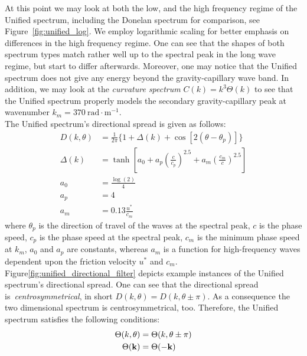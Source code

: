 At this point we may look at both the low, and the high frequency regime of the 
Unified spectrum, including the Donelan spectrum for comparison, see 
Figure~\ref{fig:unified_log}. We employ logarithmic scaling for better
emphasis on differences in the high frequency regime. One can see that the shapes
of both spectrum types match rather well up to the spectral peak in the long wave regime,
but start to differ afterwards. Moreover, one may notice that the Unified spectrum
does not give any energy beyond the gravity-capillary wave band. In addition, we may
look at the \emph{curvature spectrum} $C(k) = k^3\Theta(k)$ to see that the Unified 
spectrum properly models the secondary gravity-capillary peak at wavenumber 
$k_m = 370~\text{rad}\cdot\text{m}^{-1}$.\\

The Unified spectrum's directional spread is given as follows:
%
\begin{subequations}
\begin{align}
D(k, \theta) &= \frac{1}{2\pi}\{1 + \Delta(k) + \cos[2(\theta - 
\theta_p)]\} \\
\Delta(k) &= \tanh\left[a_0 + a_p\left(\frac{c}{c_p}\right)^{2.5} + 
a_m\left(\frac{c_m}{c}\right)^{2.5}\right] \\
a_0 &= \frac{\log(2)}{4} \\
a_p &= 4 \\
a_m &= 0.13 \frac{u^{\ast}}{c_m}
\end{align}
\end{subequations}
where $\theta_p$ is the direction of travel of the waves at the spectral peak,
$c$ is the phase speed, $c_p$ is the phase speed at the spectral peak, $c_m$
is the minimum phase speed at $k_m$, $a_0$ and $a_p$ are constants, whereas $a_m$
is a function for high-frequency waves dependent upon the friction velocity
$u^\ast$ and $c_m$. Figure\ref{fig:unified_directional_filter} depicts example
instances of the Unified spectrum's directional spread. One can see that the
directional spread is~\emph{centrosymmetrical}, in short
$D(k, \theta) = D(k, \theta \pm \pi)$. As a consequence the two dimensional
spectrum is centrosymmetrical, too. Therefore, the Unified spectrum satisfies
the following conditions:
\begin{subequations}
\begin{align}
\Theta(k, \theta) &= \Theta(k, \theta \pm \pi) \\
\Theta(\mathbf{k}) &= \Theta(-\mathbf{k})
\end{align}
\end{subequations}
